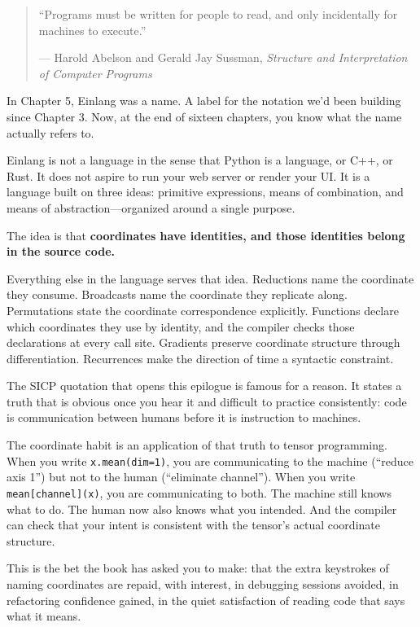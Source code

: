 \documentclass[11pt,titlepage]{article}
\begin{document}
\begin{quote}
``Programs must be written for people to read, and only incidentally for
machines to execute.''

--- Harold Abelson and Gerald Jay Sussman, \emph{Structure and
Interpretation of Computer Programs}
\end{quote}

\vspace{2em}

In Chapter 5, Einlang was a name. A label for the notation we'd been
building since Chapter 3. Now, at the end of sixteen chapters, you know
what the name actually refers to.

Einlang is not a language in the sense that Python is a language, or
C++, or Rust. It does not aspire to run your web server or render your
UI. It is a language built on three ideas: primitive expressions, means
of combination, and means of abstraction---organized around a single
purpose.

The idea is that \textbf{coordinates have identities, and those
identities belong in the source code.}

Everything else in the language serves that idea. Reductions name the
coordinate they consume. Broadcasts name the coordinate they replicate
along. Permutations state the coordinate correspondence explicitly.
Functions declare which coordinates they use by identity, and the
compiler checks those declarations at every call site. Gradients
preserve coordinate structure through differentiation. Recurrences make
the direction of time a syntactic constraint.

\vspace{2em}

The SICP quotation that opens this epilogue is famous for a reason. It
states a truth that is obvious once you hear it and difficult to
practice consistently: code is communication between humans before it is
instruction to machines.

The coordinate habit is an application of that truth to tensor
programming. When you write \texttt{x.mean(dim=1)}, you are
communicating to the machine (``reduce axis 1'') but not to the human
(``eliminate channel''). When you write \texttt{mean{[}channel{]}(x)},
you are communicating to both. The machine still knows what to do. The
human now also knows what you intended. And the compiler can check that
your intent is consistent with the tensor's actual coordinate structure.

This is the bet the book has asked you to make: that the extra
keystrokes of naming coordinates are repaid, with interest, in debugging
sessions avoided, in refactoring confidence gained, in the quiet
satisfaction of reading code that says what it means.
\end{document}
